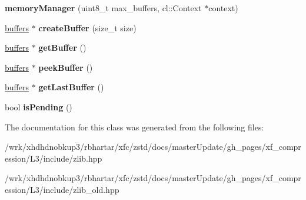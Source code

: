 \begin{DoxyCompactItemize}
\item 
\hypertarget{classxf_1_1compression_1_1memoryManager_a06244d0aae5734e40b545f9f1ce5b8ca}{{\bfseries memory\-Manager} (uint8\-\_\-t max\-\_\-buffers, cl\-::\-Context $\ast$context)}\label{classxf_1_1compression_1_1memoryManager_a06244d0aae5734e40b545f9f1ce5b8ca}

\item 
\hypertarget{classxf_1_1compression_1_1memoryManager_a41ec4b8844024a9681b5b2169d409498}{\hyperlink{structxf_1_1compression_1_1buffers}{buffers} $\ast$ {\bfseries create\-Buffer} (size\-\_\-t size)}\label{classxf_1_1compression_1_1memoryManager_a41ec4b8844024a9681b5b2169d409498}

\item 
\hypertarget{classxf_1_1compression_1_1memoryManager_aa556e1b841b4c2caf857dcca3cf61e2b}{\hyperlink{structxf_1_1compression_1_1buffers}{buffers} $\ast$ {\bfseries get\-Buffer} ()}\label{classxf_1_1compression_1_1memoryManager_aa556e1b841b4c2caf857dcca3cf61e2b}

\item 
\hypertarget{classxf_1_1compression_1_1memoryManager_ad6c764d30b210653e405ec3e1922ccdc}{\hyperlink{structxf_1_1compression_1_1buffers}{buffers} $\ast$ {\bfseries peek\-Buffer} ()}\label{classxf_1_1compression_1_1memoryManager_ad6c764d30b210653e405ec3e1922ccdc}

\item 
\hypertarget{classxf_1_1compression_1_1memoryManager_a4f063f42fc29f958f793b68e197afe59}{\hyperlink{structxf_1_1compression_1_1buffers}{buffers} $\ast$ {\bfseries get\-Last\-Buffer} ()}\label{classxf_1_1compression_1_1memoryManager_a4f063f42fc29f958f793b68e197afe59}

\item 
\hypertarget{classxf_1_1compression_1_1memoryManager_a5dc666affd08f2316ebb6bf5033c647d}{bool {\bfseries is\-Pending} ()}\label{classxf_1_1compression_1_1memoryManager_a5dc666affd08f2316ebb6bf5033c647d}

\end{DoxyCompactItemize}


The documentation for this class was generated from the following files\-:\begin{DoxyCompactItemize}
\item 
/wrk/xhdhdnobkup3/rbhartar/xfc/zstd/docs/master\-Update/gh\-\_\-pages/xf\-\_\-compression/\-L3/include/zlib.\-hpp\item 
/wrk/xhdhdnobkup3/rbhartar/xfc/zstd/docs/master\-Update/gh\-\_\-pages/xf\-\_\-compression/\-L3/include/zlib\-\_\-old.\-hpp\end{DoxyCompactItemize}
